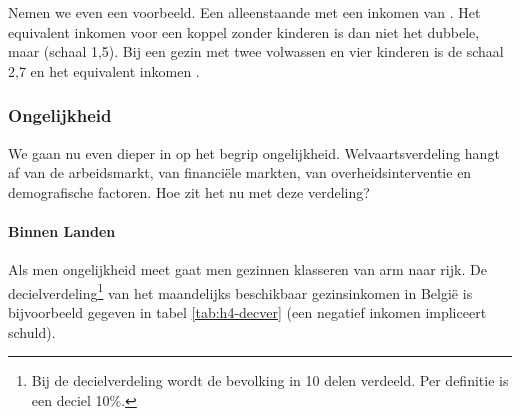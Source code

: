\par Nemen we even een voorbeeld. Een alleenstaande met een inkomen van . Het equivalent inkomen voor een koppel zonder kinderen is dan niet het dubbele, maar  (schaal 1,5). Bij een gezin met twee volwassen en vier kinderen is de schaal 2,7 en het equivalent inkomen .\\

\subsubsection{Ongelijkheid}

We gaan nu even dieper in op het begrip ongelijkheid. Welvaartsverdeling hangt af van de arbeidsmarkt, van financi\"ele markten, van overheidsinterventie en demografische factoren. Hoe zit het nu met deze verdeling?

\paragraph{Binnen Landen}

Als men ongelijkheid meet gaat men gezinnen klasseren van arm naar rijk. De decielverdeling\footnote{Bij de decielverdeling wordt de bevolking in 10 delen verdeeld. Per definitie is een deciel 10\%.} van het maandelijks beschikbaar gezinsinkomen in Belgi\"e is bijvoorbeeld gegeven in tabel \ref{tab:h4-decver} (een negatief inkomen impliceert schuld).

